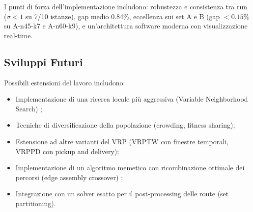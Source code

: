I punti di forza dell'implementazione includono: robustezza e consistenza tra
run ($\sigma < 1$ su 7/10 istanze), gap medio 0.84\%, eccellenza sui set A e B
(gap $<0.15\%$ su A-n45-k7 e A-n60-k9), e un'architettura software moderna con
visualizzazione real-time.

\subsection{Sviluppi Futuri}

Possibili estensioni del lavoro includono:
\begin{itemize}[nosep]
    \item Implementazione di una ricerca locale pi\`u aggressiva (Variable
    Neighborhood Search) \cite{vidal2012unified};
    \item Tecniche di diversificazione della popolazione (crowding, fitness sharing);
    \item Estensione ad altre varianti del VRP (VRPTW con finestre temporali,
    VRPPD con pickup and delivery);
    \item Implementazione di un algoritmo memetico con ricombinazione ottimale
    dei percorsi (edge assembly crossover) \cite{vidal2013hybrid};
    \item Integrazione con un solver esatto per il post-processing delle route
    (set partitioning).
\end{itemize}
